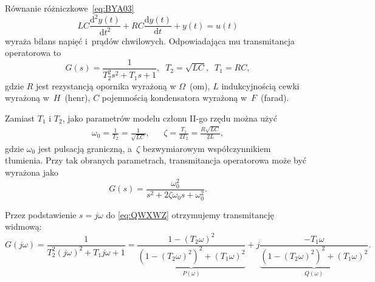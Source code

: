 \documentclass[paper=a4,DIV=12]{lpas}
\newcommand{\od}[2]{\frac{\mathrm{d}#1}{\mathrm{d}#2}}
\newcommand{\odn}[3]{\frac{\mathrm{d}^{#1}#2}{\mathrm{d}{#3}^{#1}}}
\begin{document}
\begin{appendices}
  Równanie różniczkowe~\eqref{eq:BYA03}
  \begin{equation}
    L C \odn{2}{y(t)}{t} + R C \od{y(t)}{t} + y(t) = u(t)
    \label{eq:BYA03}
  \end{equation}
  wyraża bilans napięć i~prądów chwilowych. Odpowiadająca mu transmitancja
  operatorowa to
  \begin{equation}
    G(s) = \frac{1}{T_2^2 s^2 + T_1 s + 1},
    \;\; T_2 = \sqrt{LC}, \;\; T_1 = RC,
    \label{eq:QWXWZ}
  \end{equation}
  gdzie $R$ jest rezystancją opornika wyrażoną w $\Omega$~(om), $L$
  indukcyjnością cewki wyrażoną w~$H$~(henr), $C$ pojemnością kondensatora
  wyrażoną w~$F$~(farad).

  Zamiast $T_1$ i $T_2$, jako parametrów modelu członu II-go rzędu można użyć
  \begin{equation}
    \begin{aligned}
      &
      \omega_0 = \frac{1}{T_2} = \frac{1}{\sqrt{LC}},
      &&
      \zeta = \frac{T_1}{2 T_2} = \frac{R\sqrt{LC}}{2L},
      &
    \end{aligned}
  \end{equation}
  gdzie $\omega_0$ jest pulsacją graniczną, a~$\zeta$ bezwymiarowym
  współczynnikiem tłumienia. Przy tak obranych parametrach, transmitancja
  operatorowa może być wyrażona jako
  \begin{equation}
    G(s) = \frac{\omega_0^2}{s^2 + 2\zeta\omega_0 s + \omega_0^2}.
    \label{eq:7FANL}
  \end{equation}

  Przez podstawienie $s = j\omega$ do \eqref{eq:QWXWZ}
  otrzymujemy transmitancję widmową:
  \begin{equation}
    G(j\omega) = \frac{1}{T_2^2 (j \omega)^2 + T_1 j\omega + 1}
    = \underbrace{\frac{1 - (T_2\omega)^2}{\left(1-(T_2\omega)^2\right)^2 + (T_1\omega)^2}}_{P(\omega)}
    + j \underbrace{\frac{-T_1\omega}{\left(1-(T_2\omega)^2\right)^2 + (T_1\omega)^2}}_{Q(\omega)}.
    \label{eq:LS6G7}
  \end{equation}


\end{appendices}
\end{document}
